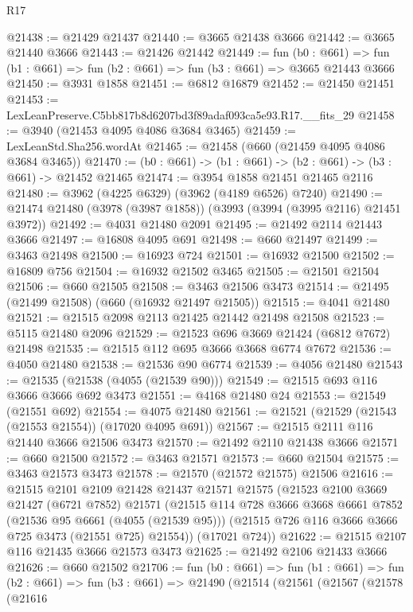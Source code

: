 \begin{lexlean}{R17}
\begin{coremodule}
@21438 := @21429 @21437
@21440 := @3665 @21438 @3666
@21442 := @3665 @21440 @3666
@21443 := @21426 @21442
@21449 := fun (b0 : @661) =>
  fun (b1 : @661) => fun (b2 : @661) => fun (b3 : @661) => @3665 @21443 @3666
@21450 := @3931 @1858
@21451 := @6812 @16879
@21452 := @21450 @21451
@21453 := LexLeanPreserve.C5bb817b8d6207bd3f89adaf093ca5e93.R17.__fits_29
@21458 := @3940 (@21453 @4095 @4086 @3684 @3465)
@21459 := LexLeanStd.Sha256.wordAt
@21465 := @21458 (@660 (@21459 @4095 @4086 @3684 @3465))
@21470 := (b0 : @661) -> (b1 : @661) -> (b2 : @661) -> (b3 : @661) -> @21452 @21465
@21474 := @3954 @1858 @21451 @21465 @2116
@21480 := @3962 (@4225 @6329) (@3962 (@4189 @6526) @7240)
@21490 := @21474 @21480 (@3978 (@3987 @1858)) (@3993 (@3994 (@3995 @2116) @21451 @3972))
@21492 := @4031 @21480 @2091
@21495 := @21492 @2114 @21443 @3666
@21497 := @16808 @4095 @691
@21498 := @660 @21497
@21499 := @3463 @21498
@21500 := @16923 @724
@21501 := @16932 @21500
@21502 := @16809 @756
@21504 := @16932 @21502 @3465
@21505 := @21501 @21504
@21506 := @660 @21505
@21508 := @3463 @21506 @3473
@21514 := @21495 (@21499 @21508) (@660 (@16932 @21497 @21505))
@21515 := @4041 @21480
@21521 := @21515 @2098 @2113 @21425 @21442 @21498 @21508
@21523 := @5115 @21480 @2096
@21529 := @21523 @696 @3669 @21424 (@6812 @7672) @21498
@21535 := @21515 @112 @695 @3666 @3668 @6774 @7672
@21536 := @4050 @21480
@21538 := @21536 @90 @6774
@21539 := @4056 @21480
@21543 := @21535 (@21538 (@4055 (@21539 @90)))
@21549 := @21515 @693 @116 @3666 @3666 @692 @3473
@21551 := @4168 @21480 @24
@21553 := @21549 (@21551 @692)
@21554 := @4075 @21480
@21561 := @21521 (@21529 (@21543 (@21553 @21554)) (@17020 @4095 @691))
@21567 := @21515 @2111 @116 @21440 @3666 @21506 @3473
@21570 := @21492 @2110 @21438 @3666
@21571 := @660 @21500
@21572 := @3463 @21571
@21573 := @660 @21504
@21575 := @3463 @21573 @3473
@21578 := @21570 (@21572 @21575) @21506
@21616 := @21515
    @2101
    @2109
    @21428
    @21437
    @21571
    @21575
    (@21523
      @2100
      @3669
      @21427
      (@6721 @7852)
      @21571
      (@21515
        @114
        @728
        @3666
        @3668
        @6661
        @7852
        (@21536 @95 @6661 (@4055 (@21539 @95)))
        (@21515 @726 @116 @3666 @3666 @725 @3473 (@21551 @725) @21554))
      (@17021 @724))
@21622 := @21515 @2107 @116 @21435 @3666 @21573 @3473
@21625 := @21492 @2106 @21433 @3666
@21626 := @660 @21502
@21706 := fun (b0 : @661) =>
  fun (b1 : @661) =>
  fun (b2 : @661) =>
  fun (b3 : @661) =>
  @21490
    (@21514
      (@21561
        (@21567
          (@21578
            (@21616

\end{coremodule}
\end{lexlean}
